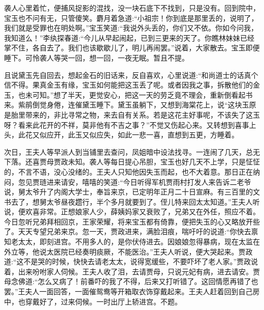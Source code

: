 \begin{parag}
    袭人心里着忙，便捕风捉影的混找，没一块石底下不找到，只是没有。回到院中，宝玉也不问有无，只管傻笑。麝月着急道:“小祖宗！你到底是那里丢的，说明了，我们就是受罪也在明处啊。”宝玉笑道:“我说外头丢的，你们又不依。你如今问我，我知道么！”李纨探春道:“今儿从早起闹起，已到三更来的天了。你瞧林妹妹已经掌不住，各自去了。我们也该歇歇儿了，明儿再闹罢。”说着，大家散去。宝玉即便睡下。可怜袭人等哭一回，想一回，一夜无眠。暂且不提。
\end{parag}


\begin{parag}
    且说黛玉先自回去，想起金石的旧话来，反自喜欢，心里说道:“和尚道士的话真个信不得。果真金玉有缘，宝玉如何能把这玉丢了呢。或者因我之事，拆散他们的金玉，也未可知。”想了半天，更觉安心，把这一天的劳乏竟不理会，重新倒看起书来。紫鹃倒觉身倦，连催黛玉睡下。黛玉虽躺下，又想到海棠花上，说“这块玉原是胎里带来的，非比寻常之物，来去自有关系。若是这花主好事呢，不该失了这玉呀？看来此花开的不祥，莫非他有不吉之事？”不觉又伤起心来。又转想到喜事上头，此花又似应开，此玉又似应失，如此一悲一喜，直想到五更，方睡着。
\end{parag}


\begin{parag}
    次日，王夫人等早派人到当铺里去查问，凤姐暗中设法找寻。一连闹了几天，总无下落。还喜贾母贾政未知。袭人等每日提心吊胆，宝玉也好几天不上学，只是怔怔的，不言不语，没心没绪的。王夫人只知他因失玉而起，也不大着意。那日正在纳闷，忽见贾琏进来请安，嘻嘻的笑道:“今日听得军机贾雨村打发人来告诉二老爷说，舅太爷升了内阁大学士，奉旨来京，已定明年正月二十日宣麻。有三百里的文书去了，想舅太爷昼夜趱行，半个多月就要到了。侄儿特来回太太知道。”王夫人听说，便欢喜非常。正想娘家人少，薛姨妈家又衰败了，兄弟又在外任，照应不着。今日忽听兄弟拜相回京，王家荣耀，将来宝玉都有倚靠，便把失玉的心又略放开些了。天天专望兄弟来京。忽一天，贾政进来，满脸泪痕，喘吁吁的说道:“你快去禀知老太太，即刻进宫。不用多人的，是你伏侍进去。因娘娘忽得暴病，现在太监在外立等，他说太医院已经奏明痰厥，不能医治。”王夫人听说，便大哭起来。贾政道:“这不是哭的时候，快快去请老太太，说得宽缓些，不要吓坏了老人家。”贾政说着，出来吩咐家人伺候。王夫人收了泪，去请贾母，只说元妃有病，进去请安。贾母念佛道:“怎么又病了！前番吓的我了不得，后来又打听错了。这回情愿再错了也罢。”王夫人一面回答，一面催鸳鸯等开箱取衣饰穿戴起来。王夫人赶着回到自己房中，也穿戴好了，过来伺候。一时出厅上轿进宫。不题。
\end{parag}


